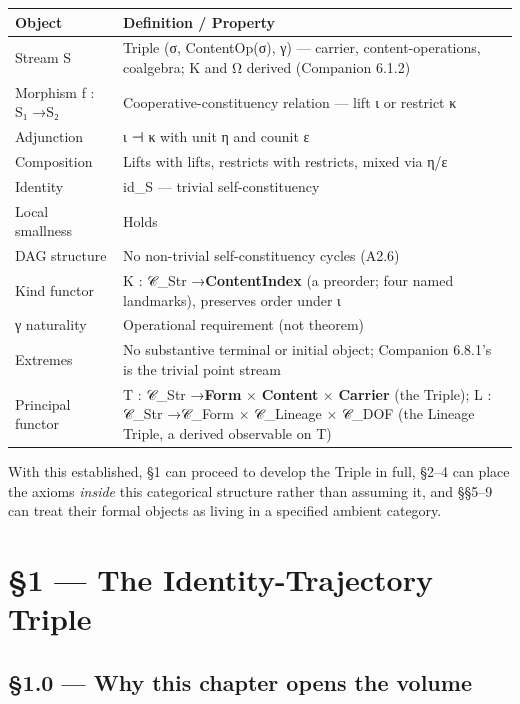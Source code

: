 \documentclass[11pt, openany]{book}
\newcommand{\sectionbreak}{\clearpage}
\begin{document}
\begingroup\setlength{\tabcolsep}{3pt}\renewcommand{\arraystretch}{1.15}\footnotesize
\begin{longtable}{p{0.59in} p{3.80in}}
\toprule
Object & Definition / Property \\
\midrule
\endhead
\bottomrule
\endfoot
Stream S & Triple (σ, ContentOp(σ), γ) --- carrier, content-operations, coalgebra; K and Ω derived (Companion 6.1.2) \\
\midrule
Morphism f : S₁ →\allowbreak  S₂ & Cooperative-constituency relation --- lift ι or restrict κ \\
\midrule
Adjunction & ι ⊣ κ with unit η and counit ε \\
\midrule
Composition & Lifts with lifts, restricts with restricts, mixed via η/\allowbreak ε \\
\midrule
Identity & id\_\allowbreak{}S --- trivial self-constituency \\
\midrule
Local smallness & Holds \\
\midrule
DAG structure & No non-trivial self-constituency cycles (A2.6) \\
\midrule
Kind functor & K : 𝒞\_\allowbreak{}Str →\allowbreak  \textbf{ContentIndex} (a preorder; four named landmarks), preserves order under ι \\
\midrule
γ naturality & Operational requirement (not theorem) \\
\midrule
Extremes & No substantive terminal or initial object; Companion 6.8.1's is the trivial point stream \\
\midrule
Principal functor & T : 𝒞\_\allowbreak{}Str →\allowbreak  \textbf{Form} × \textbf{Content} × \textbf{Carrier} (the Triple); L : 𝒞\_\allowbreak{}Str →\allowbreak  𝒞\_\allowbreak{}Form × 𝒞\_\allowbreak{}Lineage × 𝒞\_\allowbreak{}DOF (the Lineage Triple, a derived observable on T) \\
\bottomrule
\end{longtable}
\endgroup
With this established, §1 can proceed to develop the Triple in full, §2–4 can place the axioms \textit{inside} this categorical structure rather than assuming it, and §§5–9 can treat their formal objects as living in a specified ambient category.

\chapter{§1 — The Identity-Trajectory Triple}


\sectionbreak

\section{§1.0 --- Why this chapter opens the volume}
\end{document}
